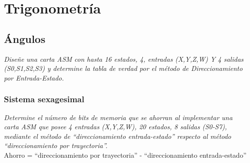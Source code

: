 \documentclass[12pt]{book}
\begin{document}

\graphicspath{ {latex/assets/} }
\newcommand{\materia}{Trigonometría}


\chapter{\materia}

\section{Ángulos}

\textit{Diseñe una carta ASM con hasta 16 estados, 4, entradas (X,Y,Z,W) Y
4 salidas (S0,S1,S2,S3) y determine la tabla de verdad por el método
de Direccionamiento por Entrada-Estado.}\\


\subsection{Sistema sexagesimal}

\begin{wideBox}{0.8}
  \lipsum[1]
\end{wideBox}

\textit{Determine el número de bits de memoria que se ahorran al
implementar una carta ASM que posee 4 entradas (X,Y,Z,W), 20
estados, 8 salidas (S0-S7), mediante el método de ``direccionamiento
entrada-estado'' respecto al método ``direccionamiento por trayectoria''.}\\

Ahorro = ``direccionamiento por trayectoria'' - ``direccionamiento
entrada-estado''\\ 

\end{document}
